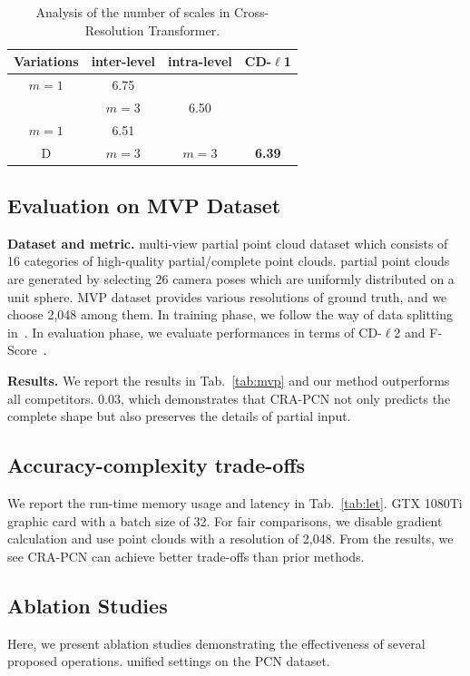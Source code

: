 \documentclass[letterpaper]{article} %
\begin{document}
{\begin{table}[!t]
\begin{center}
\begin{tabular}{c|cc|c}
\toprule
Variations& inter-level & intra-level &CD-$\ell$1 \\
\midrule
 $m = 1$ & 6.75\\
 & $m =3$ & 6.50\\
 $m =1$ & 6.51\\
D & $m=3$  & $m =3$ & \bf{6.39}\\
\bottomrule
\end{tabular}
\end{center}
\caption{Analysis of the number of scales in Cross-Resolution Transformer.}
\label{tab:ab3}
\end{table}

\subsection{Evaluation on MVP Dataset}
{\bf {Dataset and metric.}}
  multi-view partial point cloud dataset which consists of 16 categories of high-quality partial/complete point clouds.
 partial point clouds are generated by selecting 26 camera poses which are uniformly distributed on a unit sphere. MVP dataset provides various resolutions of ground truth, and we choose 2,048 among them.
In training phase, we follow the way of data splitting in~\cite{pan2021variational}. In evaluation phase, we evaluate performances in terms of CD-$\ell$2 and F-Score~\cite{tatarchenko2019single}.


{\bf {Results.}}
We report the results in Tab.~\ref{tab:mvp} and our method outperforms all competitors.
 $0.03$, which demonstrates that CRA-PCN not only predicts the complete shape but also preserves the details of partial input.


\subsection{Accuracy-complexity trade-offs}
We report the run-time memory usage and latency in Tab.~\ref{tab:let}.
 GTX 1080Ti graphic card with a batch size of 32.
For fair comparisons, we disable gradient calculation and use point clouds with a resolution of 2,048.
From the results, we see CRA-PCN can achieve better trade-offs than prior methods.

\subsection{Ablation Studies} \label{sec:ablation}
Here, we present ablation studies demonstrating the effectiveness of several proposed operations.
 unified settings on the PCN dataset.

}
\end{document}
